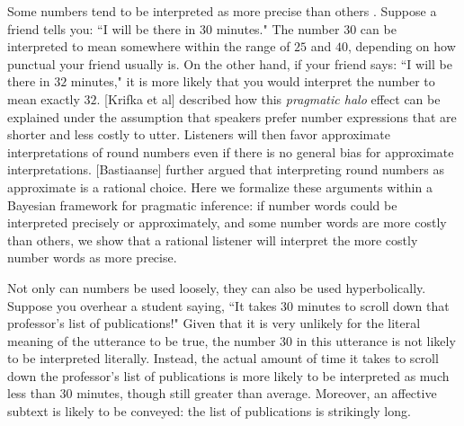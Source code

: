 \documentclass{article} %
\begin{document}
Some numbers tend to be interpreted as more precise than others \cite{Lasersohn}. Suppose a friend tells you: ``I will be there in $30$ minutes." The number $30$ can be interpreted to mean somewhere within the range of $25$ and $40$, depending on how punctual your friend usually is. On the other hand, if your friend says: ``I will be there in $32$ minutes," it is more likely that you would interpret the number to mean exactly $32$. 
[Krifka et al] described how this \emph{pragmatic halo} effect can be explained under the assumption that speakers prefer number expressions that are shorter and less costly to utter. Listeners will then favor approximate interpretations of round numbers even if there is no general bias for approximate interpretations. [Bastiaanse] further argued that interpreting round numbers as approximate is a rational choice. Here we formalize these arguments within a Bayesian framework for pragmatic inference: if number words could be interpreted precisely or approximately, and some number words are more costly than others, we show that a rational listener will interpret the more costly number words as more precise.

Not only can numbers be used loosely, they can also be used hyperbolically. Suppose you overhear a student saying, ``It takes 30 minutes to scroll down that professor's list of publications!" Given that it is very unlikely for the literal meaning of the utterance to be true, the number $30$ in this utterance is not likely to be interpreted literally. Instead, the actual amount of time it takes to scroll down the professor's list of publications is more likely to be interpreted as much less than 30 minutes, though still greater than average. Moreover, an affective subtext is likely to be conveyed: the list of publications is strikingly long.
\end{document}
